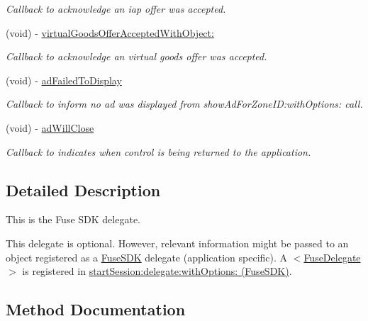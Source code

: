 \begin{DoxyCompactItemize}
\begin{DoxyCompactList}\small\item\em Callback to acknowledge an iap offer was accepted. \end{DoxyCompactList}\item 
(void) -\/ \hyperlink{protocol_fuse_delegate-p_a9577824db67c469466bd720d0193273d}{virtual\+Goods\+Offer\+Accepted\+With\+Object\+:}
\begin{DoxyCompactList}\small\item\em Callback to acknowledge an virtual goods offer was accepted. \end{DoxyCompactList}\item 
(void) -\/ \hyperlink{protocol_fuse_delegate-p_a1513d7db889fcaa54d7248f441b74072}{ad\+Failed\+To\+Display}
\begin{DoxyCompactList}\small\item\em Callback to inform no ad was displayed from show\+Ad\+For\+Zone\+I\+D\+:with\+Options\+: call. \end{DoxyCompactList}\item 
(void) -\/ \hyperlink{protocol_fuse_delegate-p_aafc293cd46be3bd70eeb60971b961a51}{ad\+Will\+Close}
\begin{DoxyCompactList}\small\item\em Callback to indicates when control is being returned to the application. \end{DoxyCompactList}\end{DoxyCompactItemize}


\subsection{Detailed Description}
This is the Fuse S\+D\+K delegate. 

This delegate is optional. However, relevant information might be passed to an object registered as a \hyperlink{interface_fuse_s_d_k}{Fuse\+S\+D\+K} delegate (application specific). A $<$\hyperlink{protocol_fuse_delegate-p}{Fuse\+Delegate}$>$ is registered in \hyperlink{interface_fuse_s_d_k_adf7ed64a02b9540c9ded4b931ea4e400}{start\+Session\+:delegate\+:with\+Options\+: (\+Fuse\+S\+D\+K)}. 

\subsection{Method Documentation}
\hypertarget{protocol_fuse_delegate-p_a1c8b10d8ec200c9d2aed94c494109a86}{}
